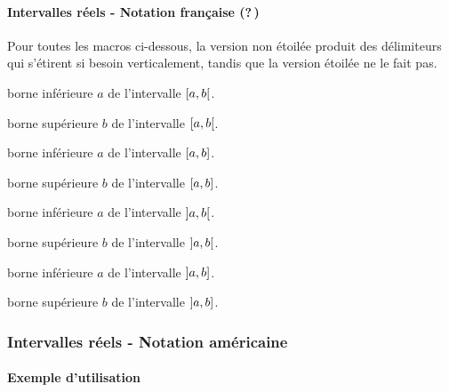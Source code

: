 \documentclass[12pt,a4paper]{article}
\begin{document}
\paragraph{Intervalles réels - Notation française (?\,)}

Pour toutes les macros ci-dessous, la version non étoilée produit des délimiteurs qui s'étirent si besoin verticalement, tandis que la version étoilée ne le fait pas.


\separation





 borne inférieure $a$ de l'intervalle $\intervalCO{a}{b}$.

 borne supérieure $b$ de l'intervalle $\intervalCO{a}{b}$.


\separation




 borne inférieure $a$ de l'intervalle $\intervalC{a}{b}$.

 borne supérieure $b$ de l'intervalle $\intervalC{a}{b}$.


\separation




 borne inférieure $a$ de l'intervalle $\intervalO{a}{b}$.

 borne supérieure $b$ de l'intervalle $\intervalO{a}{b}$.


\separation




 borne inférieure $a$ de l'intervalle $\intervalOC{a}{b}$.

 borne supérieure $b$ de l'intervalle $\intervalOC{a}{b}$.





\subsubsection{Intervalles réels - Notation américaine}

\paragraph{Exemple d'utilisation}
\end{document}
